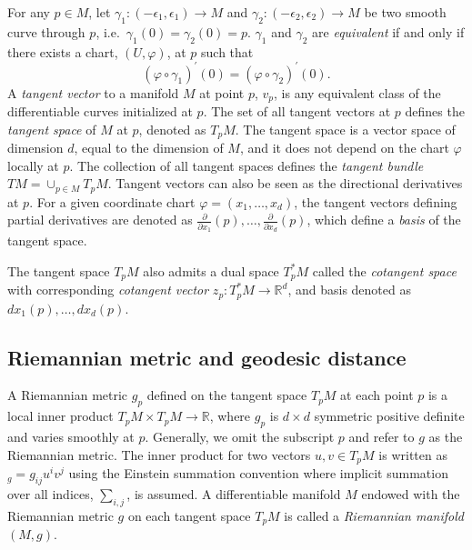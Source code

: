 \documentclass[11pt,a4paper,]{article}
\begin{document}
For any \(p \in M\), let \(\gamma_1: (-\epsilon_1, \epsilon_1)\rightarrow M\) and \(\gamma_2: (-\epsilon_2, \epsilon_2)\rightarrow M\) be two smooth curve through \(p\), i.e.~\(\gamma_1(0) = \gamma_2(0) = p\). \(\gamma_1\) and \(\gamma_2\) are \emph{equivalent} if and only if there exists a chart, \((U,\varphi)\), at \(p\) such that
\[
(\varphi \circ \gamma_1)^\prime(0) = (\varphi \circ \gamma_2)^\prime(0).
\]
A \emph{tangent vector} to a manifold \(M\) at point \(p\), \(v_p\), is any equivalent class of the differentiable curves initialized at \(p\).
The set of all tangent vectors at \(p\) defines the \emph{tangent space} of \(M\) at \(p\), denoted as \(T_pM\). The tangent space is a vector space of dimension \(d\), equal to the dimension of \(M\), and it does not depend on the chart \(\varphi\) locally at \(p\). The collection of all tangent spaces defines the \emph{tangent bundle} \(TM = \cup_{p \in M}T_pM\).
Tangent vectors can also be seen as the directional derivatives at \(p\). For a given coordinate chart \(\varphi=(x_1,\dots,x_d)\), the tangent vectors defining partial derivatives are denoted as \(\frac{\partial}{\partial x_1}(p),\dots,\frac{\partial}{\partial x_d}(p)\), which define a \emph{basis} of the tangent space.

The tangent space \(T_pM\) also admits a dual space \(T^*_pM\) called the \emph{cotangent space} with corresponding \emph{cotangent vector} \(z_p: T^*_pM \rightarrow \mathbb{R}^d\), and basis denoted as \(dx_1(p),\dots,dx_d(p)\).

\hypertarget{riemannian-metric-and-geodesic-distance}{%
\subsection{Riemannian metric and geodesic distance}\label{riemannian-metric-and-geodesic-distance}}

A Riemannian metric \(g_p\) defined on the tangent space \(T_pM\) at each point \(p\) is a local inner product \(T_pM \times T_pM \rightarrow \mathbb{R}\), where \(g_p\) is \(d\times d\) symmetric positive definite and varies smoothly at \(p\). Generally, we omit the subscript \(p\) and refer to \(g\) as the Riemannian metric.
The inner product for two vectors \(u, v \in T_pM\) is written as \(<u, v>_g = g_{ij}u^iv^j\) using the Einstein summation convention where implicit summation over all indices, \(\sum_{i,j}\), is assumed.
A differentiable manifold \(M\) endowed with the Riemannian metric \(g\) on each tangent space \(T_pM\) is called a \emph{Riemannian manifold} \((M,g)\).
\end{document}
